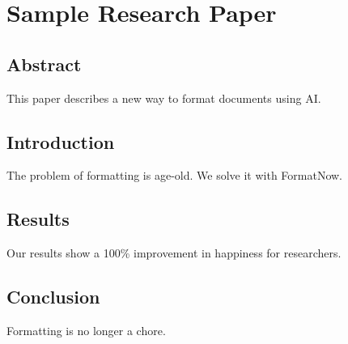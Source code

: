 \documentclass[
]{article}
\author{}
\date{}
\begin{document}
\section{Sample Research Paper}\label{sample-research-paper}

\subsection{Abstract}\label{abstract}

This paper describes a new way to format documents using AI.

\subsection{Introduction}\label{introduction}

The problem of formatting is age-old. We solve it with FormatNow.

\subsection{Results}\label{results}

Our results show a 100\% improvement in happiness for researchers.

\subsection{Conclusion}\label{conclusion}

Formatting is no longer a chore.
\end{document}
